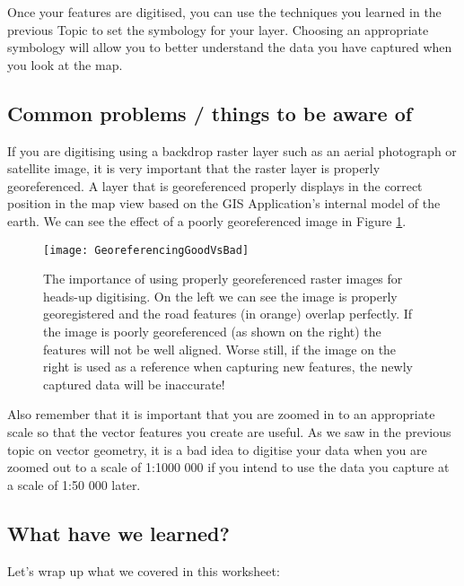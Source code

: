 
Once your features are digitised, you can use the techniques you learned in
the previous Topic to set the symbology for your layer. Choosing an
appropriate symbology will allow you to better understand the data you have
captured when you look at the map.

\subsection{Common problems / things to be aware of}

If you are digitising using a backdrop raster layer such as an aerial
photograph or satellite image, it is very important that the raster layer is
properly georeferenced. A layer that is georeferenced properly displays in
the correct position in the map view based on the GIS Application's internal
model of the earth. We can see the effect of a poorly georeferenced image in
Figure \ref{fig:refgoodbad}.

\begin{figure}[ht]
   \begin{center}
   \caption{The importance of using properly georeferenced raster images for
heads-up digitising.  On the left we can see the image is properly
georegistered and the road features (in orange) overlap perfectly. If the
image is poorly georeferenced (as shown on the right) the features will not
be well aligned. Worse still, if the image on the right is used as a
reference when capturing new features, the newly captured data will be
inaccurate!}
\label{fig:refgoodbad}\smallskip
   \texttt{[image: GeoreferencingGoodVsBad]}
\end{center}
\end{figure}

Also remember that it is important that you are zoomed in to an appropriate
scale so that the vector features you create are useful. As we saw in the
previous topic on vector geometry, it is a bad idea to digitise your data
when you are zoomed out to a scale of 1:1000 000 if you intend to use the
data you capture at a scale of 1:50 000 later.

\subsection{What have we learned?}

Let's wrap up what we covered in this worksheet:

